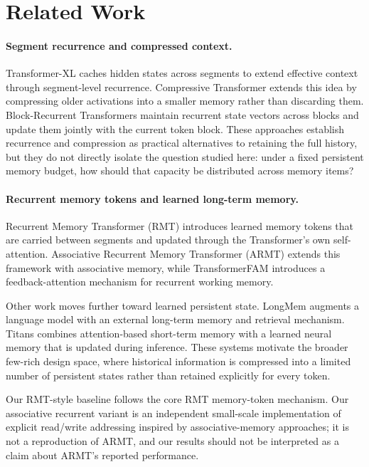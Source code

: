 \documentclass[10pt]{article} %
\begin{document}
\section{Related Work}
\label{sec:related-work}

\paragraph{Segment recurrence and compressed context.}
Transformer-XL \citep{dai2019transformerxl} caches hidden states across
segments to extend effective context through segment-level recurrence.
Compressive Transformer \citep{rae2020compressive} extends this idea by
compressing older activations into a smaller memory rather than discarding
them. Block-Recurrent Transformers \citep{hutchins2022blockrecurrent}
maintain recurrent state vectors across blocks and update them jointly with
the current token block. These approaches establish recurrence and
compression as practical alternatives to retaining the full history, but
they do not directly isolate the question studied here: under a fixed
persistent memory budget, how should that capacity be distributed across
memory items?

\paragraph{Recurrent memory tokens and learned long-term memory.}
Recurrent Memory Transformer (RMT) \citep{bulatov2022rmt} introduces
learned memory tokens that are carried between segments and updated through
the Transformer's own self-attention. Associative Recurrent Memory
Transformer (ARMT) \citep{rodkin2024armt} extends this framework with
associative memory, while TransformerFAM \citep{hwang2024transformerfam}
introduces a feedback-attention mechanism for recurrent working memory.

Other work moves further toward learned persistent state. LongMem
\citep{wang2023longmem} augments a language model with an external
long-term memory and retrieval mechanism. Titans \citep{behrouz2025titans}
combines attention-based short-term memory with a learned neural memory
that is updated during inference. These systems motivate the broader
few-rich design space, where historical information is compressed into a
limited number of persistent states rather than retained explicitly for
every token.

Our RMT-style baseline follows the core RMT memory-token mechanism. Our
associative recurrent variant is an independent small-scale implementation
of explicit read/write addressing inspired by associative-memory
approaches; it is not a reproduction of ARMT, and our results should not be
interpreted as a claim about ARMT's reported performance.
\end{document}

